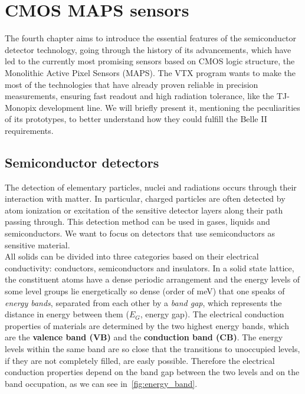 \chapter{CMOS MAPS sensors} \label{ch:CMOS}

The fourth chapter aims to introduce the essential features of the semiconductor detector technology, going through the history of its advancements, which have led to the currently most promising sensors based on CMOS logic structure, the Monolithic Active Pixel Sensors (MAPS). The VTX program wants to make the most of the technologies that have already proven reliable in precision measurements, ensuring fast readout and high radiation tolerance, like the TJ-Monopix development line. We will briefly present it, mentioning the peculiarities of its prototypes, to better understand how they could fulfill the Belle II requirements.


\section{Semiconductor detectors} 

The detection of elementary particles, nuclei and radiations occurs through their interaction with matter. In particular, charged particles are often detected by atom ionization or excitation of the sensitive detector layers along their path passing through. This detection method can be used in gases, liquids and semiconductors. We want to focus on detectors that use semiconductors as sensitive material. \\

All solids can be divided into three categories based on their electrical conductivity: conductors, semiconductors and insulators. 
In a solid state lattice, the constituent atoms have a dense periodic arrangement and the energy levels of some level groups lie energetically so dense (order of meV) that one speaks of \emph{energy bands}, separated from each other by a \emph{band gap}, which represents the distance in energy between them (\textbf{$E_{G}$}, energy gap). The electrical conduction properties of materials are determined by the two highest energy bands, which are the \textbf{valence band (VB)} and the \textbf{conduction band (CB)}. The energy levels within the same band are so close that the transitions to unoccupied levels, if they are not completely filled, are easly possible. Therefore the electrical conduction properties depend on the band gap between the two levels and on the band occupation, as we can see in~\autoref{fig:energy_band}.


